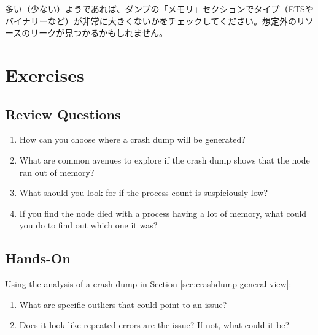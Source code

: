 多い（少ない）ようであれば、ダンプの「メモリ」セクションでタイプ（ETSやバイナリーなど）が非常に大きくないかをチェックしてください。想定外のリソースのリークが見つかるかもしれません。

\section{Exercises}

\subsection*{Review Questions}

\begin{enumerate}
	\item How can you choose where a crash dump will be generated?
	\item What are common avenues to explore if the crash dump shows that the node ran out of memory?
	\item What should you look for if the process count is suspiciously low?
	\item If you find the node died with a process having a lot of memory, what could you do to find out which one it was?\end{enumerate}

\subsection*{Hands-On}

Using the analysis of a crash dump in Section \ref{sec:crashdump-general-view}:

\begin{enumerate}
	\item What are specific outliers that could point to an issue?
	\item Does it look like repeated errors are the issue? If not, what could it be? 
\end{enumerate}

